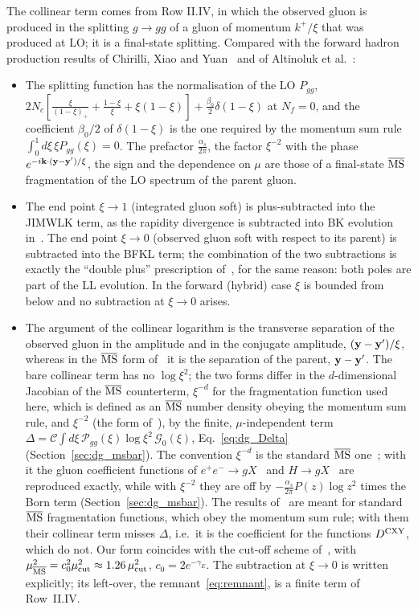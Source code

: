 The collinear term comes from Row II.IV, in which the observed gluon is produced in the splitting $g\to gg$ of a gluon of momentum $k^+/\xi$ that was produced at LO; it is a final-state splitting. Compared with the forward hadron production results of Chirilli, Xiao and Yuan~\cite{Chirilli:2011km,Chirilli:2012jd} and of Altinoluk et al.~\cite{Altinoluk:2014eka}:
\begin{itemize}
\item The splitting function has the normalisation of the LO $P_{gg}$, $2N_c[\frac{\xi}{(1-\xi)_+}+\frac{1-\xi}{\xi}+\xi(1-\xi)]+\frac{\beta_0}{2}\delta(1-\xi)$ at $N_f=0$, and the coefficient $\beta_0/2$ of $\delta(1-\xi)$ is the one required by the momentum sum rule $\int_0^1d\xi\,\xi P_{gg}(\xi)=0$. The prefactor $\frac{\alpha_s}{2\pi}$, the factor $\xi^{-2}$ with the phase $e^{-i\mathbf{k}\cdot(\mathbf{y}-\mathbf{y}')/\xi}$, the sign and the dependence on $\mu$ are those of a final-state $\overline{\rm MS}$ fragmentation of the LO spectrum of the parent gluon.
\item The end point $\xi\to1$ (integrated gluon soft) is plus-subtracted into the JIMWLK term, as the rapidity divergence is subtracted into BK evolution in~\cite{Chirilli:2012jd}. The end point $\xi\to0$ (observed gluon soft with respect to its parent) is subtracted into the BFKL term; the combination of the two subtractions is exactly the ``double plus'' prescription of~\cite{Kovner:2023vsy}, for the same reason: both poles are part of the LL evolution. In the forward (hybrid) case $\xi$ is bounded from below and no subtraction at $\xi\to0$ arises.
\item The argument of the collinear logarithm is the transverse separation of the observed gluon in the amplitude and in the conjugate amplitude, $(\mathbf{y}-\mathbf{y}')/\xi$, whereas in the $\overline{\rm MS}$ form of~\cite{Chirilli:2012jd,Altinoluk:2014eka} it is the separation of the parent, $\mathbf{y}-\mathbf{y}'$. The bare collinear term has no $\log\xi^2$; the two forms differ in the $d$-dimensional Jacobian of the $\overline{\rm MS}$ counterterm, $\xi^{-d}$ for the fragmentation function used here, which is defined as an $\overline{\rm MS}$ number density obeying the momentum sum rule, and $\xi^{-2}$ (the form of~\cite{Chirilli:2012jd}), by the finite, $\mu$-independent term $\Delta=\mathcal C\int d\xi\,\mathcal P_{gg}(\xi)\log\xi^2\,\mathcal G_0(\xi)$, Eq.~\eqref{eq:dg_Delta} (Section~\ref{sec:dg_msbar}). The convention $\xi^{-d}$ is the standard $\overline{\rm MS}$ one~\cite{Catani:1996vz}; with it the gluon coefficient functions of $e^+e^-\to gX$~\cite{Altarelli:1979kv,Kretzer:2000yf} and $H\to gX$~\cite{Almasy:2011eq} are reproduced exactly, while with $\xi^{-2}$ they are off by $-\frac{\alpha_s}{2\pi}P(z)\log z^2$ times the Born term (Section~\ref{sec:dg_msbar}). The results of~\cite{Chirilli:2012jd,Altinoluk:2014eka} are meant for standard $\overline{\rm MS}$ fragmentation functions, which obey the momentum sum rule; with them their collinear term misses $\Delta$, i.e.\ it is the coefficient for the functions $D^{\rm CXY}$, which do not. Our form coincides with the cut-off scheme of~\cite{Altinoluk:2014eka}, with $\mu^2_{\overline{\rm MS}}=c_0^2\mu^2_{\rm cut}\approx1.26\,\mu^2_{\rm cut}$, $c_0=2e^{-\gamma_E}$. The subtraction at $\xi\to0$ is written explicitly; its left-over, the remnant~\eqref{eq:remnant}, is a finite term of Row~II.IV.

\end{itemize}
